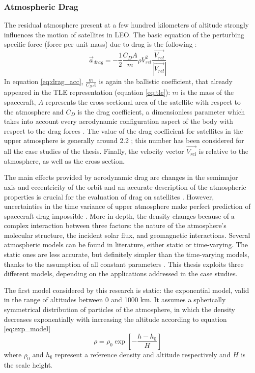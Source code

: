 \subsubsection{Atmospheric Drag}
The residual atmosphere present at a few hundred kilometers of altitude strongly influences the motion of satellites in LEO.
The basic equation of the perturbing specific force (force per unit mass) due to drag is the following \cite{vallado2013fundamentals}:
\begin{equation} \label{eq:drag_acc}
    \vec{a}_{drag} = - \frac{1}{2} \frac{C_D A}{m} \rho V_{rel}^{2} \frac{\vec{V_{rel}}}{|\vec{V_{rel}}|}
\end{equation}
In equation \ref{eq:drag_acc}, $\frac{m}{C_D A}$ is again the ballistic coefficient, that already appeared in the TLE representation (equation \ref{eq:tle}):
$m$ is the mass of the spacecraft, $A$ represents the cross-sectional area of the satellite with respect to the atmosphere and $C_D$ is the drag coefficient, a dimensionless parameter which takes into account every aerodynamic configuration aspect of the body with respect to the drag forces \cite{sadraey2009drag}.
The value of the drag coefficient for satellites in the upper atmosphere is generally around 2.2 \cite{vallado2013fundamentals};
this number has been considered for all the case studies of the thesis.
Finally, the velocity vector $\vec{V_{rel}}$ is relative to the atmosphere, as well as the cross section.

The main effects provided by aerodynamic drag are changes in the semimajor axis and eccentricity of the orbit and an accurate description of the atmospheric properties is crucial for the evaluation of drag on satellites \cite{vallado2013fundamentals}.
However, uncertainties in the time variance of upper atmosphere make perfect prediction of spacecraft drag impossible \cite{brown1998spacecraft}.
More in depth, the density changes because of a complex interaction between three factors: the nature of the atmosphere's molecular structure, the incident solar flux, and geomagnetic interactions.
Several atmospheric models can be found in literature, either static or time-varying.
The static ones are less accurate, but definitely simpler than the time-varying models, thanks to the assumption of all constant parameters \cite{vallado2013fundamentals}.
This thesis exploits three different models, depending on the applications addressed in the case studies.

The first model considered by this research is static: the exponential model, valid in the range of altitudes between 0 and 1000 km.
It assumes a spherically symmetrical distribution of particles of the atmosphere, in which the density decreases exponentially with increasing the altitude according to equation \ref{eq:exp_model} \cite{vallado2013fundamentals}
\begin{equation} \label{eq:exp_model}
    \rho = \rho_0 \exp{\left[- \frac{h - h_0}{H}\right]}
\end{equation}
where $\rho_0$ and $h_0$ represent a reference density and altitude respectively and $H$ is the scale height.

